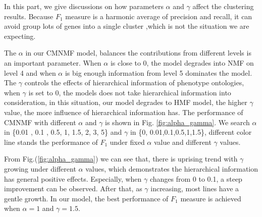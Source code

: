 \documentclass{bmcart}
\begin{document}
In this part, we give discussions on how parameters $\alpha$ and $\gamma$ affect the clustering results. Because $F_1$ measure is a  harmonic average of precision and recall, it can avoid group lots of genes into a single cluster ,which is not the situation we are expecting.

The $\alpha$ in our CMNMF model, balances the contributions from different levels is an important parameter. When $\alpha$ is close to 0, the model degrades into NMF on level 4 and when $\alpha$ is big enough information from level 5 dominates the model. The $\gamma$ controls the effects of hierarchical information of phenotype ontologies, when $\gamma$ is set to 0, the models does not take hierarchical information into consideration, in this situation, our model degrades to HMF model, the higher $\gamma$ value, the more influence of hierarchical information has.
 The performance of CMNMF with different $\alpha$ and $\gamma$ is shown in Fig. \ref{fig:alpha_gamma}. We search $\alpha$ in \{0.01 , 0.1 , 0.5, 1, 1.5, 2, 3, 5\} and $\gamma$ in \{0, 0.01,0.1,0.5,1,1.5\}, different color line stands the performance of $F_1$ under fixed $\alpha$ value and different $\gamma$ values.

From Fig.(\ref{fig:alpha_gamma}) we can see that, there is uprising trend with $\gamma$ growing under different $\alpha$ values, which demonstrates the hierarchical information has general positive effects. Especially, when $\gamma$ changes from 0 to 0.1, a steep improvement can be observed. After that, as $\gamma$ increasing, most lines have a gentle growth. In our model, the best performance of $F_1$ measure is achieved when $\alpha=1$ and $\gamma = 1.5$.
\end{document}
